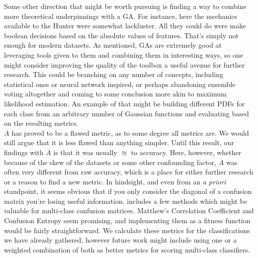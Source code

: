 Some other direction that might be worth pursuing is finding a way to combine more theoretical underpinnings with a GA.  For instance, here the mechanics available to the Hunter were somewhat lackluster.  All they could do were make boolean decisions based on the absolute values of features.  That's simply not enough for modern datasets.  As mentioned, GAs are extremely good at leveraging tools given to them and combining them in interesting ways, so one might consider improving the quality of the toolbox a useful avenue for further research. This could be branching on any number of concepts, including statistical ones or neural network inspired, or perhaps abandoning ensemble voting altogether and coming to some conclusion more akin to maximum likelihood estimation.  An example of that might be building different PDFs for each class from an arbitrary number of Gaussian functions and evaluating based on the resulting metrics.\\
$\overline{A}$ has proved to be a flawed metric, as to some degree all metrics are. We would still argue that it is less flawed than anything simpler.  Until this result, our findings with $\overline{A}$ is that it was usually $\approxeq$ to accuracy.    Here, however, whether because of the skew of the datasets or some other confounding factor, $\overline{A}$ was often very different from raw accuracy, which is a place for either further research or a reason to find a new metric. In hindsight, and even from an \textit{a priori} standpoint, it seems obvious that if you only consider the diagonal of a confusion matrix you're losing useful information.  \cite{jurman_comparison_2012} includes a few methods which might be valuable for multi-class confusion matrices.     Matthew's Correlation Coefficient and Confusion Entropy seem promising, and implementing them as a fitness function would be fairly straightforward.   We calculate these metrics for the classifications we have already gathered, however future work might include using one or a weighted combination of both as better metrics for scoring multi-class classifiers.
\\ 
